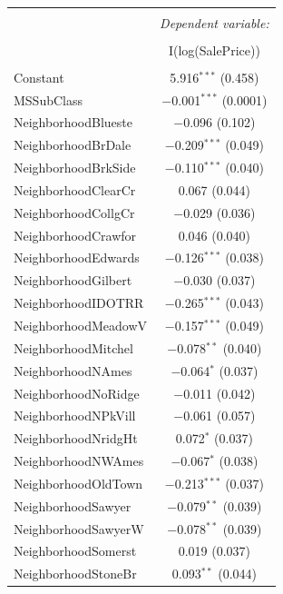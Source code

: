 \documentclass[]{article}
\begin{document}
\begin{table}[!htbp] \centering 
  \caption{} 
  \label{} 
\normalsize 
\begin{tabular}{@{\extracolsep{5pt}}lc} 
\\[-1.8ex]\hline 
\hline \\[-1.8ex] 
 & \multicolumn{1}{c}{\textit{Dependent variable:}} \\ 
\cline{2-2} 
\\[-1.8ex] & I(log(SalePrice)) \\ 
\hline \\[-1.8ex] 
 Constant & 5.916$^{***}$ (0.458) \\ 
  MSSubClass & $-$0.001$^{***}$ (0.0001) \\ 
  NeighborhoodBlueste & $-$0.096 (0.102) \\ 
  NeighborhoodBrDale & $-$0.209$^{***}$ (0.049) \\ 
  NeighborhoodBrkSide & $-$0.110$^{***}$ (0.040) \\ 
  NeighborhoodClearCr & 0.067 (0.044) \\ 
  NeighborhoodCollgCr & $-$0.029 (0.036) \\ 
  NeighborhoodCrawfor & 0.046 (0.040) \\ 
  NeighborhoodEdwards & $-$0.126$^{***}$ (0.038) \\ 
  NeighborhoodGilbert & $-$0.030 (0.037) \\ 
  NeighborhoodIDOTRR & $-$0.265$^{***}$ (0.043) \\ 
  NeighborhoodMeadowV & $-$0.157$^{***}$ (0.049) \\ 
  NeighborhoodMitchel & $-$0.078$^{**}$ (0.040) \\ 
  NeighborhoodNAmes & $-$0.064$^{*}$ (0.037) \\ 
  NeighborhoodNoRidge & $-$0.011 (0.042) \\ 
  NeighborhoodNPkVill & $-$0.061 (0.057) \\ 
  NeighborhoodNridgHt & 0.072$^{*}$ (0.037) \\ 
  NeighborhoodNWAmes & $-$0.067$^{*}$ (0.038) \\ 
  NeighborhoodOldTown & $-$0.213$^{***}$ (0.037) \\ 
  NeighborhoodSawyer & $-$0.079$^{**}$ (0.039) \\ 
  NeighborhoodSawyerW & $-$0.078$^{**}$ (0.039) \\ 
  NeighborhoodSomerst & 0.019 (0.037) \\ 
  NeighborhoodStoneBr & 0.093$^{**}$ (0.044) \\ 

\end{tabular}
\end{table}
\end{document}
